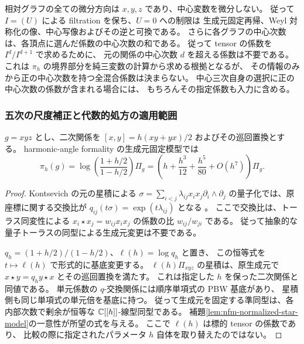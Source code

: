 \begin{remark}
\label{rem:nfm-central-filtration}
相対グラフの全ての微分方向は $x,y,z$ であり、中心変数を微分しない。
従って $I=(U)$ による filtration を保ち、$U=0$ への制限は
生成元固定再帰、Weyl 対称化の像、中心写像およびその逆と可換である。
さらに各グラフの中心次数は、各頂点に選んだ係数の中心次数の和である。
従って tensor の係数を $I^d/I^{d+1}$ で求めるために、
元の関係の中心次数 $d$ を超える係数は不要である。
これは $\pi_h$ の境界部分を純三変数の計算から求める根拠となるが、
その情報のみから正の中心次数を持つ全混合係数は決まらない。
中心三次自身の選択に正の中心次数の係数が含まれる場合には、
もちろんその指定係数も入力に含める。
\end{remark}

\subsubsection{五次の尺度補正と代数的処方の適用範囲}

\begin{lemma}
\label{lem:nfm-log-canonical-inverse}
$g=xyz$ とし、二次関係を
$[x,y]=h(xy+yx)/2$ およびその巡回置換とする。
harmonic-angle formality の生成元固定模型では
\[
 \pi_h(g)=\log\left(\frac{1+h/2}{1-h/2}\right)\Pi_g
       =\left(h+\frac{h^3}{12}+\frac{h^5}{80}+O(h^7)\right)\Pi_g.
\]
\end{lemma}

\begin{proof}
Kontsevich の元の星積による
$\sigma=\sum_{i<j}\lambda_{ij}x_ix_j\partial_i\wedge\partial_j$
の量子化では、原座標に関する交換比が
$q_{ij}(t\sigma)=\exp(t\lambda_{ij})$ となる
\cite[Section~1.6; Theorem~6.9 and Remark~6.10, pp.~59--60]{NFMLindbergPym}。
ここで交換比は、トーラス同変性による
$x_i\star x_j=w_{ij}x_ix_j$ の係数の比 $w_{ij}/w_{ji}$ である。
従って抽象的な量子トーラスの同型による生成元変更は不要である。

$q_h=(1+h/2)/(1-h/2)$、$\ell(h)=\log q_h$ と置き、
この恒等式を $t\mapsto\ell(h)$ で形式的に基底変更する。
$\ell(h)\Pi_{xyz}$ の星積は、原生成元で
$x\star y=q_h y\star x$ とその巡回置換を満たす。
これは指定した $h$ を保った二次関係と同値である。
単元係数の $q$-交換関係には順序単項式の PBW 基底があり、
星積側も同じ単項式の単元倍を基底に持つ。
従って生成元を固定する準同型は、各内部次数で剰余が恒等な
$\mathbb C[[h]]$-線型同型である。
補題\ref{lem:nfm-normalized-star-model}の一意性が所望の式を与える。
ここで $\ell(h)$ は標的 tensor の係数であり、
比較の際に指定されたパラメータ $h$ 自体を取り替えたのではない。
\end{proof}

